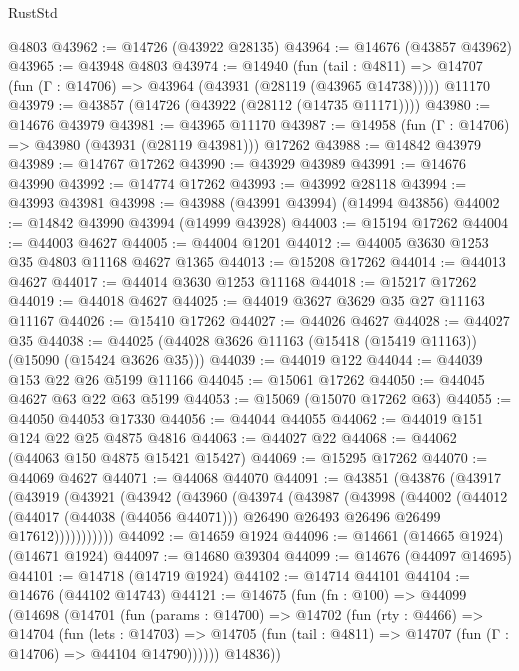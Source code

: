 \begin{lexlean}{RustStd}
\begin{coremodule}
    @4803
@43962 := @14726 (@43922 @28135)
@43964 := @14676 (@43857 @43962)
@43965 := @43948 @4803
@43974 := @14940
    (fun (tail : @4811) => @14707 (fun (Γ : @14706) => @43964 (@43931 (@28119 (@43965 @14738)))))
    @11170
@43979 := @43857 (@14726 (@43922 (@28112 (@14735 @11171))))
@43980 := @14676 @43979
@43981 := @43965 @11170
@43987 := @14958 (fun (Γ : @14706) => @43980 (@43931 (@28119 @43981))) @17262
@43988 := @14842 @43979
@43989 := @14767 @17262
@43990 := @43929 @43989
@43991 := @14676 @43990
@43992 := @14774 @17262
@43993 := @43992 @28118
@43994 := @43993 @43981
@43998 := @43988 (@43991 @43994) (@14994 @43856)
@44002 := @14842 @43990 @43994 (@14999 @43928)
@44003 := @15194 @17262
@44004 := @44003 @4627
@44005 := @44004 @1201
@44012 := @44005 @3630 @1253 @35 @4803 @11168 @4627 @1365
@44013 := @15208 @17262
@44014 := @44013 @4627
@44017 := @44014 @3630 @1253 @11168
@44018 := @15217 @17262
@44019 := @44018 @4627
@44025 := @44019 @3627 @3629 @35 @27 @11163 @11167
@44026 := @15410 @17262
@44027 := @44026 @4627
@44028 := @44027 @35
@44038 := @44025 (@44028 @3626 @11163 (@15418 (@15419 @11163)) (@15090 (@15424 @3626 @35)))
@44039 := @44019 @122
@44044 := @44039 @153 @22 @26 @5199 @11166
@44045 := @15061 @17262
@44050 := @44045 @4627 @63 @22 @63 @5199
@44053 := @15069 (@15070 @17262 @63)
@44055 := @44050 @44053 @17330
@44056 := @44044 @44055
@44062 := @44019 @151 @124 @22 @25 @4875 @4816
@44063 := @44027 @22
@44068 := @44062 (@44063 @150 @4875 @15421 @15427)
@44069 := @15295 @17262
@44070 := @44069 @4627
@44071 := @44068 @44070
@44091 := @43851
    (@43876
      (@43917
        (@43919
          (@43921
            (@43942
              (@43960
                (@43974
                  (@43987
                    (@43998
                      (@44002
                        (@44012
                          (@44017 (@44038 (@44056 @44071)))
                          @26490
                          @26493
                          @26496
                          @26499
                          @17612)))))))))))
@44092 := @14659 @1924
@44096 := @14661 (@14665 @1924) (@14671 @1924)
@44097 := @14680 @39304
@44099 := @14676 (@44097 @14695)
@44101 := @14718 (@14719 @1924)
@44102 := @14714 @44101
@44104 := @14676 (@44102 @14743)
@44121 := @14675
    (fun (fn : @100) =>
    @44099
      (@14698
        (@14701
          (fun (params : @14700) =>
          @14702
            (fun (rty : @4466) =>
            @14704
              (fun (lets : @14703) =>
              @14705 (fun (tail : @4811) => @14707 (fun (Γ : @14706) => @44104 @14790))))))
        @14836))

\end{coremodule}
\end{lexlean}

